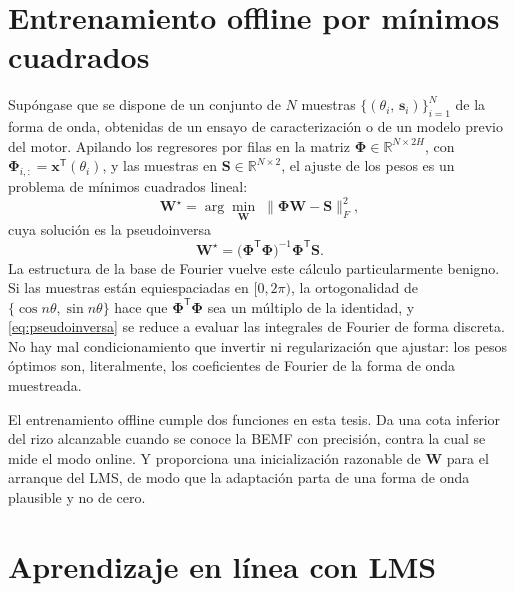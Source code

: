 \documentclass[../../../Tesis_JALS_Maestria.tex]{subfiles}
\begin{document}
\section{Entrenamiento offline por mínimos cuadrados}
\label{sec:offline}

Supóngase que se dispone de un conjunto de $N$ muestras $\{(\theta_i,\,\mathbf{s}_i)\}_{i=1}^N$ de la forma de onda, obtenidas de un ensayo de caracterización o de un modelo previo del motor. Apilando los regresores por filas en la matriz $\boldsymbol{\Phi} \in \mathbb{R}^{N\times 2H}$, con $\boldsymbol{\Phi}_{i,:} = \mathbf{x}^{\mathsf T}(\theta_i)$, y las muestras en $\mathbf{S} \in \mathbb{R}^{N\times 2}$, el ajuste de los pesos es un problema de mínimos cuadrados lineal:
\begin{equation}
    \mathbf{W}^\star = \arg\min_{\mathbf{W}} \;\bigl\|\boldsymbol{\Phi}\mathbf{W} - \mathbf{S}\bigr\|_F^2,
    \label{eq:ls-offline}
\end{equation}
cuya solución es la pseudoinversa
\begin{equation}
    \mathbf{W}^\star = \bigl(\boldsymbol{\Phi}^{\mathsf T}\boldsymbol{\Phi}\bigr)^{-1}\boldsymbol{\Phi}^{\mathsf T}\mathbf{S}.
    \label{eq:pseudoinversa}
\end{equation}
La estructura de la base de Fourier vuelve este cálculo particularmente benigno. Si las muestras están equiespaciadas en $[0,2\pi)$, la ortogonalidad de $\{\cos n\theta,\sin n\theta\}$ hace que $\boldsymbol{\Phi}^{\mathsf T}\boldsymbol{\Phi}$ sea un múltiplo de la identidad, y \eqref{eq:pseudoinversa} se reduce a evaluar las integrales de Fourier de forma discreta. No hay mal condicionamiento que invertir ni regularización que ajustar: los pesos óptimos son, literalmente, los coeficientes de Fourier de la forma de onda muestreada.

El entrenamiento offline cumple dos funciones en esta tesis. Da una cota inferior del rizo alcanzable cuando se conoce la BEMF con precisión, contra la cual se mide el modo online. Y proporciona una inicialización razonable de $\mathbf{W}$ para el arranque del LMS, de modo que la adaptación parta de una forma de onda plausible y no de cero.

\section{Aprendizaje en línea con LMS}
\label{sec:online}
\end{document}
